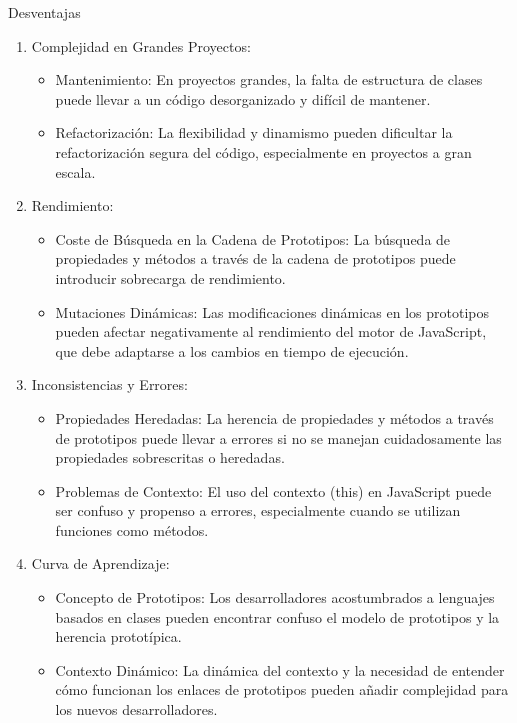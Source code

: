 \documentclass{article}
\begin{document}
Desventajas

\begin{enumerate}
    \item Complejidad en Grandes Proyectos:
          \begin{itemize}
            \item Mantenimiento: En proyectos grandes, la falta de estructura de clases puede llevar a un código 
            desorganizado y difícil de mantener.
            \item Refactorización: La flexibilidad y dinamismo pueden dificultar la refactorización segura del 
            código, especialmente en proyectos a gran escala.
          \end{itemize}
    \item Rendimiento:
          \begin{itemize}
            \item Coste de Búsqueda en la Cadena de Prototipos: La búsqueda de propiedades y métodos a través de la 
            cadena de prototipos puede introducir sobrecarga de rendimiento.
            \item Mutaciones Dinámicas: Las modificaciones dinámicas en los prototipos pueden afectar negativamente 
            al rendimiento del motor de JavaScript, que debe adaptarse a los cambios en tiempo de ejecución.
          \end{itemize}
    \item Inconsistencias y Errores:
          \begin{itemize}
            \item Propiedades Heredadas: La herencia de propiedades y métodos a través de prototipos puede llevar a 
            errores si no se manejan cuidadosamente las propiedades sobrescritas o heredadas.
            \item Problemas de Contexto: El uso del contexto (this) en JavaScript puede ser confuso y propenso a 
            errores, especialmente cuando se utilizan funciones como métodos.  
          \end{itemize}
    \item Curva de Aprendizaje:
          \begin{itemize}
            \item Concepto de Prototipos: Los desarrolladores acostumbrados a lenguajes basados en clases pueden 
            encontrar confuso el modelo de prototipos y la herencia prototípica.
            \item Contexto Dinámico: La dinámica del contexto y la necesidad de entender cómo funcionan los enlaces 
            de prototipos pueden añadir complejidad para los nuevos desarrolladores.
          \end{itemize} 
\end{enumerate}
\end{document}
